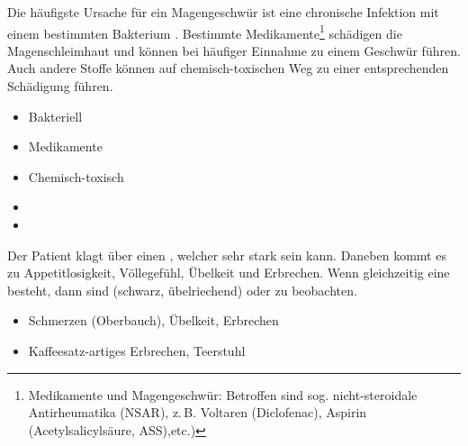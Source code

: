 {%
 Die häufigste Ursache für ein
Magengeschwür ist eine chronische Infektion mit einem
bestimmten Bakterium \citep{Malfertheiner2004}. Bestimmte
Medikamente\footnote{Medikamente und Magengeschwür:
Betroffen sind sog. nicht-steroidale Antirheumatika (NSAR),
z.\,B.
Voltaren{\texttrademark} (Diclofenac),
Aspirin{\texttrademark} (Acetylsalicylsäure, ASS),etc.)}
schädigen die Magenschleimhaut und können bei
häufiger Einnahme zu einem Geschwür führen. Auch andere
Stoffe können auf chemisch-toxischen Weg zu einer
entsprechenden Schädigung führen.  
}{
\begin{itemize}
    \item Bakteriell 
    \item Medikamente
    \item Chemisch-toxisch
    \item {}
    \item {}
\end{itemize}
}{}{}{}

{Der Patient klagt über einen
, welcher sehr stark sein
kann. Daneben kommt es zu Appetitlosigkeit, Völlegefühl,
Übelkeit und Erbrechen. Wenn gleichzeitig eine 
besteht, dann sind 
(schwarz, übelriechend) oder  zu beobachten. 
}{
\begin{itemize}
    \item Schmerzen (Oberbauch), Übelkeit, Erbrechen
    \item Kaffeesatz-artiges Erbrechen, Teerstuhl
\end{itemize}
}{}{}{}


%   

